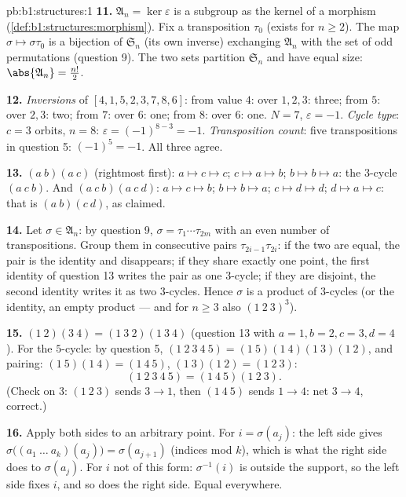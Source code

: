 \begin{solution}{pb:b1:structures:1}
\textbf{11.} $\mathfrak A_n = \ker\varepsilon$ is a subgroup as
the kernel of a morphism (\cref{def:b1:structures:morphism}). Fix
a transposition $\tau_0$ (exists for $n \geq 2$). The map $\sigma
\mapsto \sigma\tau_0$ is a bijection of $\mathfrak S_n$ (its own
inverse) exchanging $\mathfrak A_n$ with the set of odd
permutations (question 9). The two sets partition $\mathfrak S_n$
and have equal size: $\abs{\mathfrak A_n} = \frac{n!}2$.

\textbf{12.} \emph{Inversions} of $[4, 1, 5, 2, 3, 7, 8, 6]$: from
value $4$: over $1, 2, 3$: three; from $5$: over $2, 3$: two;
from $7$: over $6$: one; from $8$: over $6$: one. $N = 7$,
$\varepsilon = -1$. \emph{Cycle type}: $c = 3$ orbits, $n = 8$:
$\varepsilon = (-1)^{8-3} = -1$. \emph{Transposition count}: five
transpositions in question 5: $(-1)^5 = -1$. All three agree.

\textbf{13.} $(a\ b)(a\ c)$ (rightmost first): $a \mapsto c
\mapsto c$; $c \mapsto a \mapsto b$; $b \mapsto b \mapsto a$:
the $3$-cycle $(a\ c\ b)$. And $(a\ c\ b)(a\ c\ d)$: $a \mapsto c
\mapsto b$; $b \mapsto b \mapsto a$; $c \mapsto d \mapsto d$; $d
\mapsto a \mapsto c$: that is $(a\ b)(c\ d)$, as claimed.

\textbf{14.} Let $\sigma \in \mathfrak A_n$: by question 9,
$\sigma = \tau_1\cdots\tau_{2m}$ with an even number of
transpositions. Group them in consecutive pairs
$\tau_{2i-1}\tau_{2i}$: if the two are equal, the pair is the
identity and disappears; if they share exactly one point, the
first identity of question 13 writes the pair as one $3$-cycle;
if they are disjoint, the second identity writes it as two
$3$-cycles. Hence $\sigma$ is a product of $3$-cycles (or the
identity, an empty product --- and for $n \geq 3$ also $(1\ 2\
3)^3$).

\textbf{15.} $(1\ 2)(3\ 4) = (1\ 3\ 2)(1\ 3\ 4)$ (question 13
with $a{=}1, b{=}2, c{=}3, d{=}4$). For the $5$-cycle: by
question 5, $(1\ 2\ 3\ 4\ 5) = (1\ 5)(1\ 4)(1\ 3)(1\ 2)$, and
pairing: $(1\ 5)(1\ 4) = (1\ 4\ 5)$, $(1\ 3)(1\ 2) = (1\ 2\ 3)$:
\[
(1\ 2\ 3\ 4\ 5) = (1\ 4\ 5)(1\ 2\ 3) .
\]
(Check on $3$: $(1\ 2\ 3)$ sends $3 \to 1$, then $(1\ 4\ 5)$
sends $1 \to 4$: net $3 \to 4$, correct.)

\textbf{16.} Apply both sides to an arbitrary point. For $i =
\sigma(a_j)$: the left side gives $\sigma\bigl((a_1\ \dots\
a_k)(a_j)\bigr) = \sigma(a_{j+1})$ (indices mod $k$), which is
what the right side does to $\sigma(a_j)$. For $i$ not of this
form: $\sigma^{-1}(i)$ is outside the support, so the left side
fixes $i$, and so does the right side. Equal everywhere.


\end{solution}
